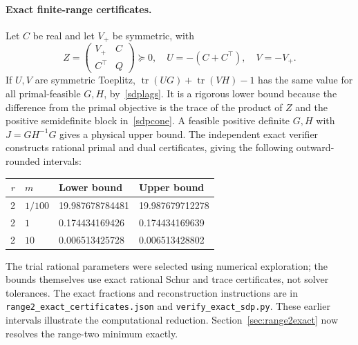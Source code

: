 \documentclass[11pt]{article}
\begin{document}
\paragraph{Exact finite-range certificates.}
Let $C$ be real and let $V_+$ be symmetric, with
\[
 Z=\begin{pmatrix}V_+&C\\ C^\top&Q\end{pmatrix}\succeq0,
 \quad U=-(C+C^\top),\quad V=-V_+.
\]
If $U,V$ are symmetric Toeplitz, $\operatorname{tr}(UG)+\operatorname{tr}(VH)-1$ has the same value for all primal-feasible $G,H$, by~\eqref{sdplags}. It is a rigorous lower bound because the difference from the primal objective is the trace of the product of $Z$ and the positive semidefinite block in~\eqref{sdpcone}. A feasible positive definite $G,H$ with $J=GH^{-1}G$ gives a physical upper bound. The independent exact verifier constructs rational primal and dual certificates, giving the following outward-rounded intervals:
\begin{center}
\begin{tabular}{@{}rlll@{}}
\toprule
$r$ & $m$ & Lower bound & Upper bound \\\midrule
2 & $1/100$ & 19.987678784481 & 19.987679712278\\
2 & $1$ & 0.174434169426 & 0.174434169639\\
2 & $10$ & 0.006513425728 & 0.006513428802\\\bottomrule
\end{tabular}
\end{center}
The trial rational parameters were selected using numerical exploration; the bounds themselves use exact rational Schur and trace certificates, not solver tolerances. The exact fractions and reconstruction instructions are in \texttt{range2\_exact\_certificates.json} and \texttt{verify\_exact\_sdp.py}. These earlier intervals illustrate the computational reduction. Section~\ref{sec:range2exact} now resolves the range-two minimum exactly.
\end{document}
